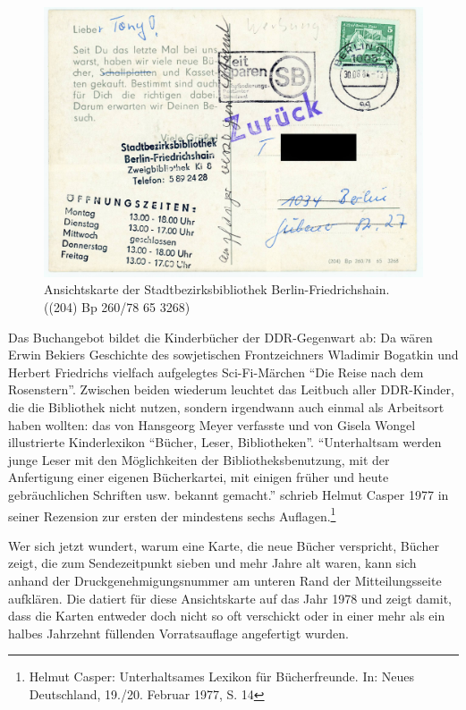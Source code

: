 \documentclass[a4paper,
fontsize=11pt,
oneside,
numbers=noperiodatend,
parskip=half-,
bibliography=totoc,
final
]{scrartcl}
\begin{document}
\begin{figure}
\centering
\includegraphics{img/abb2.jpg}
\caption{Ansichtskarte der Stadtbezirksbibliothek Berlin-Friedrichshain.
((204) Bp 260/78 65 3268)}
\end{figure}

Das Buchangebot bildet die Kinderbücher der DDR-Gegenwart ab: Da wären
Erwin Bekiers Geschichte des sowjetischen Frontzeichners Wladimir
Bogatkin und Herbert Friedrichs vielfach aufgelegtes Sci-Fi-Märchen
\enquote{Die Reise nach dem Rosenstern}. Zwischen beiden wiederum
leuchtet das Leitbuch aller DDR-Kinder, die die Bibliothek nicht nutzen,
sondern irgendwann auch einmal als Arbeitsort haben wollten: das von
Hansgeorg Meyer verfasste und von Gisela Wongel illustrierte
Kinderlexikon \enquote{Bücher, Leser, Bibliotheken}.
\enquote{Unterhaltsam werden junge Leser mit den Möglichkeiten der
Bibliotheksbenutzung, mit der Anfertigung einer eigenen Bücherkartei,
mit einigen früher und heute gebräuchlichen Schriften usw. bekannt
gemacht.} schrieb Helmut Casper 1977 in seiner Rezension zur ersten der
mindestens sechs Auflagen.\footnote{Helmut Casper: Unterhaltsames
  Lexikon für Bücherfreunde. In: Neues Deutschland, 19./20. Februar
  1977, S. 14}

Wer sich jetzt wundert, warum eine Karte, die neue Bücher verspricht,
Bücher zeigt, die zum Sendezeitpunkt sieben und mehr Jahre alt waren,
kann sich anhand der Druckgenehmigungsnummer am unteren Rand der
Mitteilungsseite aufklären. Die datiert für diese Ansichtskarte auf das
Jahr 1978 und zeigt damit, dass die Karten entweder doch nicht so oft
verschickt oder in einer mehr als ein halbes Jahrzehnt füllenden
Vorratsauflage angefertigt wurden.
\end{document}
